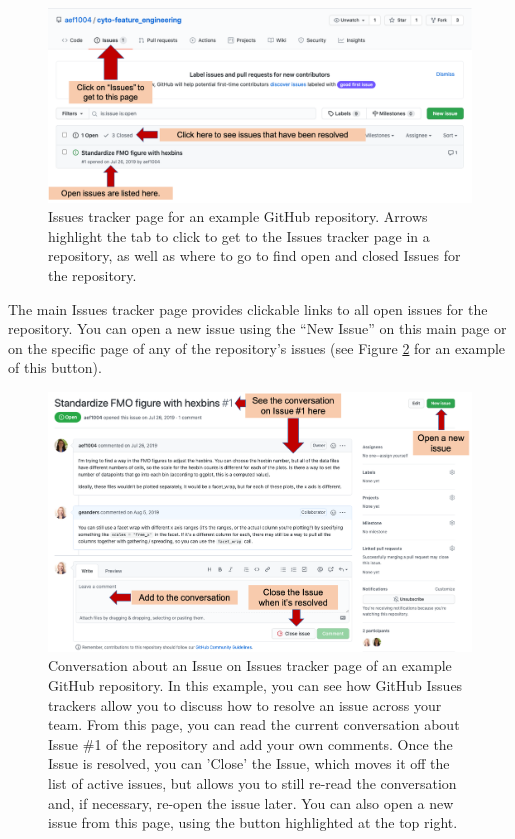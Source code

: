 \documentclass[]{tufte-book}
\begin{document}
\begin{figure}
\includegraphics[width=\textwidth]{figures/github_issues} \caption[Issues tracker page for an example GitHub repository]{Issues tracker page for an example GitHub repository. Arrows highlight the tab to click to get to the Issues tracker page in a repository, as well as where to go to find open and closed Issues for the repository.}\label{fig:githubissues1}
\end{figure}

The main Issues tracker page provides clickable links to all open issues for
the repository. You can open a new issue using the ``New Issue'' on this main
page or on the specific page of any of the repository's issues (see Figure
\ref{fig:githubissues2} for an example of this button).

\begin{figure}
\includegraphics[width=\textwidth]{figures/github_issues2} \caption[Conversation about an Issue on Issues tracker page of an example GitHub repository]{Conversation about an Issue on Issues tracker page of an example GitHub repository. In this example, you can see how GitHub Issues trackers allow you to discuss how to resolve an issue across your team. From this page, you can read the current conversation about Issue \#1 of the repository and add your own comments. Once the Issue is resolved, you can 'Close' the Issue, which moves it off the list of active issues, but allows you to still re-read the conversation and, if necessary, re-open the issue later. You can also open a new issue from this page, using the button highlighted at the top right.}\label{fig:githubissues2}
\end{figure}
\end{document}

